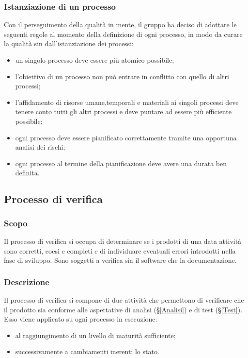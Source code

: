 \subsubsection{Istanziazione di un processo}
Con il perseguimento della qualità in mente, il gruppo \textit{\Gruppo{}} ha deciso di adottare le seguenti regole al momento della definizione di ogni processo, in modo da curare la qualità sin dall'istanziazione dei processi:
\begin{itemize}
	\item un singolo processo deve essere più atomico possibile;
	\item l'obiettivo di un processo non può entrare in conflitto con quello di altri processi;
	\item l'affidamento di risorse umane,temporali e materiali ai singoli processi deve tenere conto tutti gli altri processi e deve puntare ad essere più efficiente possibile;
	\item ogni processo deve essere pianificato correttamente tramite una opportuna analisi dei rischi;
	\item ogni processo al termine della pianificazione deve avere una durata ben definita.
\end{itemize}
\subsection{Processo di verifica}
\subsubsection{Scopo}
Il processo di verifica si occupa di determinare se i prodotti di una data attività sono corretti, coesi e completi e di individuare eventuali errori introdotti nella fase di sviluppo. Sono soggetti a verifica sia il software che la documentazione.
\subsubsection{Descrizione}
Il processo di verifica si compone di due attività che permettono di verificare che il prodotto sia conforme alle aspettative di analisi (\S{}\ref{Analisi}) e di test (\S{}\ref{Test}). Esso viene applicato su ogni processo in esecuzione:
\begin{itemize}
	\item al raggiungimento di un livello di maturità sufficiente;
	\item successivamente a cambiamenti inerenti lo stato.
\end{itemize}
